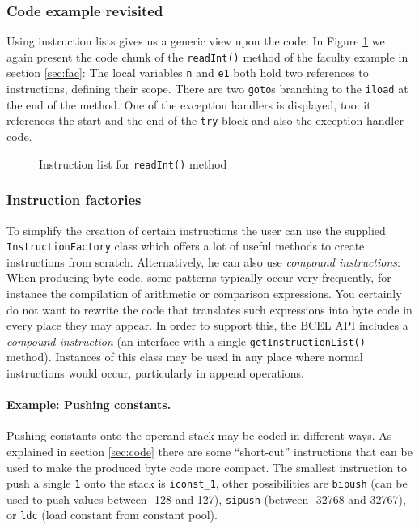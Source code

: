 \documentclass[12pt,twoside]{article}
\newcommand\jc{{\sffamily BCEL }}
\newcommand\cpe{constant pool}
\begin{document}
\subsubsection{Code example revisited}

Using  instruction lists gives  us a  generic view  upon the  code: In
Figure  \ref{fig:il}   we  again  present   the  code  chunk   of  the
\texttt{readInt()}   method  of   the  faculty   example   in  section
\ref{sec:fac}:  The local  variables \texttt{n}  and  \texttt{e1} both
hold two references to  instructions, defining their scope.  There are
two \texttt{goto}s branching  to the \texttt{iload} at the  end of the
method. One of the exception handlers is displayed, too: it references
the start and the end of the \texttt{try} block and also the exception
handler code.

\begin{figure}[htbp]
  \begin{center}
    \leavevmode
    \epsfxsize\textwidth
    \caption{Instruction list for \texttt{readInt()} method}
    \label{fig:il}
  \end{center}
\end{figure}

\subsubsection{Instruction factories}\label{sec:compound}

To simplify the creation of certain instructions the user can use the
supplied \texttt{InstructionFactory} class which offers a lot of
useful methods to create instructions from scratch. Alternatively, he
can also use \emph{compound instructions}: When producing byte code,
some patterns typically occur very frequently, for instance the
compilation of arithmetic or comparison expressions.  You certainly do
not want to rewrite the code that translates such expressions into
byte code in every place they may appear. In order to support this,
the \jc API includes a \emph{compound instruction} (an interface with
a single \texttt{getInstructionList()} method).  Instances of this
class may be used in any place where normal instructions would occur,
particularly in append operations.

\paragraph{Example: Pushing constants.}
Pushing constants  onto the  operand stack may  be coded  in different
ways.  As   explained  in   section  \ref{sec:code}  there   are  some
``short-cut'' instructions that can be  used to make the produced byte
code  more  compact.  The   smallest  instruction  to  push  a  single
\texttt{1} onto  the stack is  \texttt{iconst\_1}, other possibilities
are \texttt{bipush} (can be used to push values between -128 and 127),
\texttt{sipush}  (between  -32768 and  32767),  or \texttt{ldc}  (load
constant from \cpe).
\end{document}
